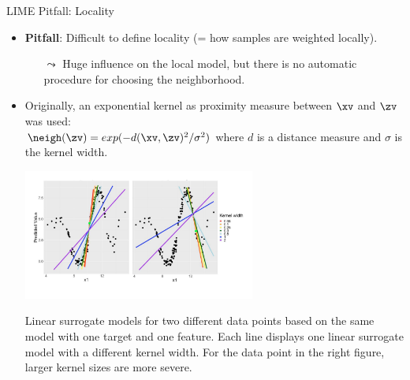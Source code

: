 \documentclass[11pt,compress,t,notes=noshow, aspectratio=169, xcolor=table]{beamer}
\begin{document}
\begin{vbframe}[c]{LIME Pitfall: Locality}

	\begin{itemize} 
     \item \textbf{Pitfall}: Difficult to define locality (= how samples are weighted locally). 
     \begin{itemize}
         \item[$\leadsto$] Huge influence on the local model, but there is no automatic procedure for choosing the neighborhood.
     \end{itemize}
     \item Originally, an exponential kernel as proximity measure between $\xv$ and $\zv$ was used:\\
     	$\neigh(\zv) = exp(-d(\xv, \zv)^2/\sigma^2)$ where $d$ is a distance measure and $\sigma$ is the kernel width. 
     	 \begin{center}
     		\includegraphics[width=0.6\textwidth]{figure/lime_locality}
     		\vspace{-0.5cm}
     		
     		\scriptsize{Linear surrogate models for two different data points based on the same model with one target and one feature. Each line displays one linear surrogate model with a different kernel width. For the data point in the right figure, larger kernel sizes are more severe.}
     		
     	\end{center}
     \end{itemize}
\end{vbframe}
\end{document}

